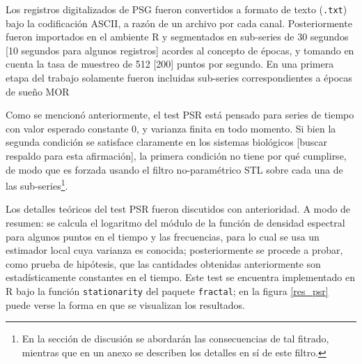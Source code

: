 Los registros digitalizados de PSG fueron convertidos a formato de texto (\texttt{.txt}) bajo
la codificaci\'on ASCII, a raz\'on de un archivo por cada canal. Posteriormente fueron importados
en el ambiente R y segmentados en sub-series de 30 segundos [10 segundos para algunos 
registros] acordes al concepto de \'epocas, y tomando en cuenta la tasa de muestreo de 512 [200]
puntos por segundo. 
En una primera etapa del trabajo solamente fueron incluidas sub-series correspondientes a
\'epocas de sue\~no MOR

Como se mencion\'o anteriormente, el test PSR est\'a pensado para
series de tiempo con valor esperado constante 0, y varianza finita en todo momento. Si bien la 
segunda condici\'on se satisface claramente en los sistemas biol\'ogicos [buscar respaldo
para esta afirmaci\'on], la primera condici\'on no tiene por qu\'e cumplirse, de modo que es 
forzada
usando el filtro no-param\'etrico STL\cite{Cleveland1990} sobre cada una de las 
sub-series\footnote{En la secci\'on de discusi\'on se abordar\'an las consecuencias de tal fitrado,
mientras que en un anexo se describen los detalles en s\'i de este filtro.}.


Los detalles te\'oricos del test PSR fueron discutidos con anterioridad. A modo
de resumen: se calcula el logaritmo del m\'odulo de la funci\'on de densidad
espectral para algunos puntos en el tiempo y las frecuencias, para lo cual se usa un estimador
local cuya varianza es conocida; posteriormente se procede a probar, como prueba de
hip\'otesis, que las cantidades obtenidas anteriormente son estad\'isticamente constantes
en el tiempo.
Este test se encuentra implementado en R bajo la funci\'on \texttt{stationarity}
del paquete \texttt{fractal}; en la figura \ref{res_psr} puede verse la forma en que se
visualizan los resultados.

